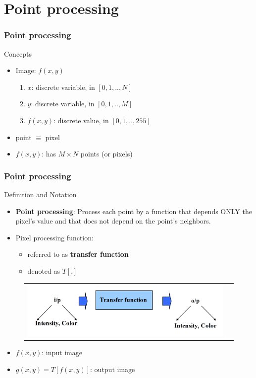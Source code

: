 \documentclass[english,11pt,table,handout]{beamer}
\begin{document}
\section{Point processing}
\frame
{
	\frametitle{Point processing}
	\begin{block}{Concepts}
		\begin{itemize}
			\item Image: $f(x,y)$
			\begin{enumerate}
				\item $x$: discrete variable, in $[0,1, .., N]$
				\item $y$: discrete variable, in $[0,1, .., M]$
				\item $f(x,y)$: discrete value, in $[0,1, .., 255]$
			\end{enumerate}
			\item point $\equiv$ pixel
			\item $f(x,y)$: has $M \times N$ points (or pixels)
		\end{itemize}
	\end{block}

	
}
\frame
{
	\frametitle{Point processing}
	\begin{block}{Definition and Notation}
		\begin{itemize}
			\item \textbf{Point processing}: Process each point by a function that depends ONLY the pixel's value and that does not depend on the point's neighbors.	
			\item Pixel processing function:
			\begin{itemize}
				\item referred to as \textbf{transfer function}
				\item denoted as $T[.]$
			\end{itemize} 
		\end{itemize}
	\end{block}

	\begin{figure}[!h]
		\begin{tabular}{cc}
			\includegraphics[scale=0.4]{point_process_model.png} &
		\end{tabular}
		
	\end{figure}
	\begin{itemize}
		\item $f(x,y)$: input image
		\item $g(x,y) = T[f(x,y)]$: output image
	\end{itemize}
	
}
\end{document}
